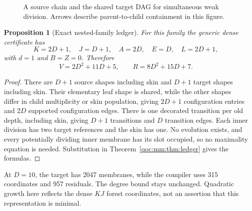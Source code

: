 \documentclass[11pt,letterpaper]{article}
\newtheorem{proposition}[theorem]{Proposition}
\theoremstyle{definition}
\theoremstyle{remark}
\begin{document}
\begin{figure}[H]
\centering
{}
\caption{A source chain and the shared target DAG for simultaneous weak division. Arrows describe parent-to-child containment in this figure.}
\label{qoc:mm:fig:nested}
\end{figure}

\begin{proposition}[Exact nested-family ledger]
For this family the generic dense certificate has
\[
 K=2D+1,\quad J=D+1,\quad A=2D,\quad E=D,\quad L=2D+1,
\]
with $d=1$ and $B=Z=0$. Therefore
\[
 V=2D^2+11D+5,\qquad R=8D^2+15D+7.
\]
\end{proposition}
\begin{proof}
There are $D+1$ source shapes including skin and $D+1$ target shapes including skin. Their elementary leaf shape is shared, while the other shapes differ in child multiplicity or skin population, giving $2D+1$ configuration entries and $2D$ supported configuration edges. There is one decorated transition per old depth, including skin, giving $D+1$ transitions and $D$ transition edges. Each inner division has two target references and the skin has one. No evolution exists, and every potentially dividing inner membrane has its slot occupied, so no maximality equation is needed. Substitution in Theorem~\ref{qoc:mm:thm:ledger} gives the formulas.
\end{proof}
At $D=10$, the target has 2047 membranes, while the compiler uses 315 coordinates and 957 residuals. The degree bound stays unchanged. Quadratic growth here reflects the dense $KJ$ forest coordinates, not an assertion that this representation is minimal.
\end{document}
